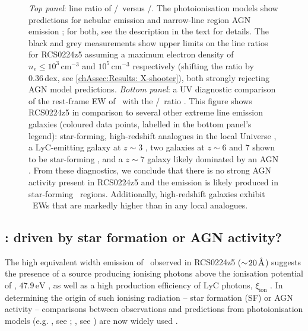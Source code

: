 \begin{figure}
    \caption[\CIV/\HeII\ line ratio diagnostics]{\textit{Top panel}: line ratio of \CIV/\CIII\ versus \CIV/\HeII. The photoionisation models show predictions for nebular emission \citep[indicated as star-forming or SF; models from][]{2016MNRAS.462.1757G} and narrow-line region AGN emission \citep[models from][]{2016MNRAS.456.3354F}; for both, see the description in the text for details. The black and grey measurements show upper limits on the line ratios for RCS0224z5 assuming a maximum electron density of $n_e \leq 10^3 \, \mathrm{cm^{-3}}$ and $10^5 \, \mathrm{cm^{-3}}$ respectively (shifting the ratio by $0.36 \, \mathrm{dex}$, see \cref{chAssec:Results: X-shooter}), both strongly rejecting AGN model predictions. \textit{Bottom panel}: a UV diagnostic comparison of the rest-frame EW of \CIV\ with the \CIV/\CIII\ ratio \citep[from][]{2019MNRAS.487..333H}. This figure shows RCS0224z5 in comparison to several other extreme line emission galaxies (coloured data points, labelled in the bottom panel's legend): star-forming, high-redshift analogues in the local Universe \citep[; see text for details]{2017MNRAS.472.2608S, 2019ApJ...874...93B}, a LyC-emitting galaxy at $z \sim 3$ \citep{2020MNRAS.491.1093V}, two galaxies at $z \sim 6$ and $7$ shown to be star-forming \citep{2015MNRAS.454.1393S, 2017ApJ...836L..14M}, and a $z \sim 7$ galaxy likely dominated by an AGN \citep{2017ApJ...851...40L}. From these diagnostics, we conclude that there is no strong AGN activity present in RCS0224z5 and the emission is likely produced in star-forming \HII\ regions. Additionally, high-redshift galaxies exhibit \CIV\ EWs that are markedly higher than in any local analogues.}
    \label{chAfig:Line ratios CIV-HeII}
\end{figure}

\subsection{\texorpdfstring{\CIV}{C IV}: driven by star formation or AGN activity?}
\label{chAssec:Discussion: CIV}

The high equivalent width emission of \CIV\ observed in RCS0224z5 ($\sim \! 20 \, \text{\AA}$) suggests the presence of a source producing ionising photons above the ionisation potential of \CIII, $47.9 \, \mathrm{eV}$ \citep[e.g.][]{2019ApJ...878L...3B}, as well as a high production efficiency of LyC photons, $\xi_\text{ion}$ \citep[e.g.][]{2015MNRAS.454.1393S}. In determining the origin of such ionising radiation -- star formation (SF) or AGN activity -- comparisons between observations and predictions from photoionisation models (e.g. , see \citealt{2013RMxAA..49..137F}; , see \citealt{2013ApJS..208...10D}) are now widely used \citep[e.g.][; ]{2001ApJ...556..121K, 2016MNRAS.462.1757G, 2016MNRAS.456.3354F}.

